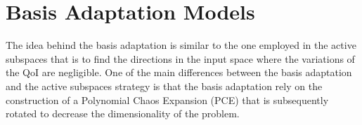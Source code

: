 \chapter{Basis Adaptation Models}\label{Chap:BasAdapt}
The idea behind the basis adaptation is similar to the one employed in the active subspaces that is to find the directions
in the input space where the variations of the QoI are negligible. One of the main differences between the basis adaptation and
the active subspaces strategy is that the basis adaptation rely on the construction of a Polynomial Chaos Expansion (PCE) that is 
subsequently rotated to decrease the dimensionality of the problem.